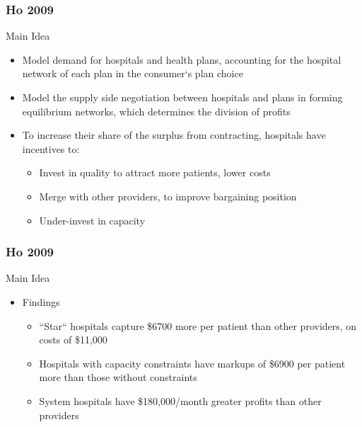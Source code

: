 \documentclass[notes=show]{beamer}
\begin{document}
\begin{frame}
\frametitle{Ho 2009}

Main Idea
\begin{itemize}
	\item Model demand for hospitals and health plans, accounting for the hospital network of each plan in the consumer`s plan choice
	\item Model the supply side negotiation between hospitals and plans in forming equilibrium networks, which determines the division of profits
        \item To increase their share of the surplus from contracting, hospitals have incentives to:
         \begin{itemize}
	\item Invest in quality to attract more patients, lower costs
	\item Merge with other providers, to improve bargaining position
	\item Under-invest in capacity
	\end{itemize}
\end{itemize}
\end{frame}


\begin{frame}
\frametitle{Ho 2009}

Main Idea
\begin{itemize}
\item Findings
\begin{itemize}
\item ``Star`` hospitals capture \$6700 more per patient than other providers, on costs of \$11,000
\item Hospitals with capacity constraints have markups of \$6900 per patient more than those without constraints
\item System hospitals have \$180,000/month greater profits than other providers
\end{itemize}
\end{itemize}
\end{frame}
\end{document}
